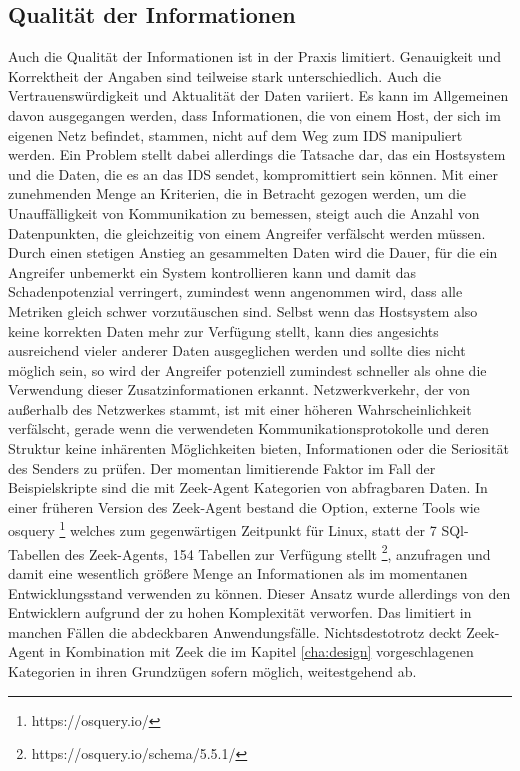 \subsection{Qualität der Informationen}
Auch die Qualität der Informationen ist in der Praxis limitiert. Genauigkeit und Korrektheit der Angaben sind teilweise stark unterschiedlich. Auch die Vertrauenswürdigkeit und Aktualität der Daten variiert. Es kann im Allgemeinen davon ausgegangen werden, dass Informationen, die von einem Host, der sich im eigenen Netz befindet, stammen, nicht auf dem Weg zum IDS manipuliert werden. Ein Problem stellt dabei allerdings die Tatsache dar, das ein Hostsystem und die Daten, die es an das IDS sendet, kompromittiert sein können. Mit einer zunehmenden Menge an Kriterien, die in Betracht gezogen werden, um die Unauffälligkeit von Kommunikation zu bemessen, steigt auch die Anzahl von Datenpunkten, die gleichzeitig von einem Angreifer verfälscht werden müssen. Durch einen stetigen Anstieg an gesammelten Daten wird die Dauer, für die ein Angreifer unbemerkt ein System kontrollieren kann und damit das Schadenpotenzial verringert, zumindest wenn angenommen wird, dass alle Metriken gleich schwer vorzutäuschen sind. Selbst wenn das Hostsystem also keine korrekten Daten mehr zur Verfügung stellt, kann dies angesichts ausreichend vieler anderer Daten ausgeglichen werden und sollte dies nicht möglich sein, so wird der Angreifer potenziell zumindest schneller als ohne die Verwendung dieser Zusatzinformationen erkannt. Netzwerkverkehr, der von außerhalb des Netzwerkes stammt, ist mit einer höheren Wahrscheinlichkeit verfälscht, gerade wenn die verwendeten Kommunikationsprotokolle und deren Struktur keine inhärenten Möglichkeiten bieten, Informationen oder die Seriosität des Senders zu prüfen.
Der momentan limitierende Faktor im Fall der Beispielskripte sind die mit Zeek-Agent Kategorien von abfragbaren Daten. In einer früheren Version des Zeek-Agent bestand die Option, externe Tools wie osquery \footnote{https://osquery.io/} welches zum gegenwärtigen Zeitpunkt für Linux, statt der 7 SQl-Tabellen des Zeek-Agents, 154 Tabellen zur Verfügung stellt \footnote{https://osquery.io/schema/5.5.1/}, anzufragen und damit eine wesentlich größere Menge an Informationen als im momentanen Entwicklungsstand verwenden zu können. Dieser Ansatz wurde allerdings von den Entwicklern aufgrund der zu hohen Komplexität verworfen. Das limitiert in manchen Fällen die abdeckbaren Anwendungsfälle. Nichtsdestotrotz deckt Zeek-Agent in Kombination mit Zeek die im Kapitel \ref{cha:design} vorgeschlagenen Kategorien in ihren Grundzügen sofern möglich, weitestgehend ab.
